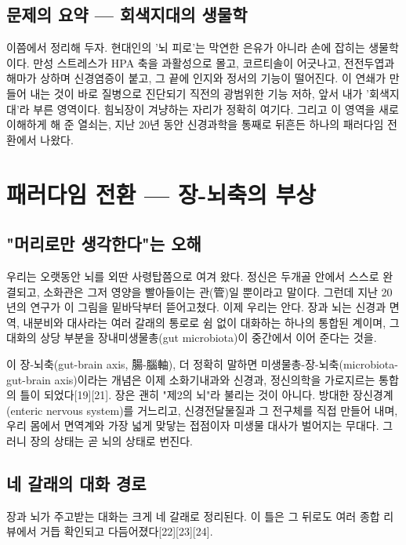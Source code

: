 \documentclass[12pt,oneside]{book}
\begin{document}
\subsection{문제의 요약 — 회색지대의 생물학}

이쯤에서 정리해 두자. 현대인의 '뇌 피로'는 막연한 은유가 아니라 손에 잡히는 생물학이다. 만성 스트레스가 HPA 축을 과활성으로 몰고, 코르티솔이 어긋나고, 전전두엽과 해마가 상하며 신경염증이 붙고, 그 끝에 인지와 정서의 기능이 떨어진다. 이 연쇄가 만들어 내는 것이 바로 질병으로 진단되기 직전의 광범위한 기능 저하, 앞서 내가 '회색지대'라 부른 영역이다. 힘뇌장이 겨냥하는 자리가 정확히 여기다. 그리고 이 영역을 새로 이해하게 해 준 열쇠는, 지난 20년 동안 신경과학을 통째로 뒤흔든 하나의 패러다임 전환에서 나왔다.

\section{패러다임 전환 — 장-뇌축의 부상}

\subsection{"머리로만 생각한다"는 오해}

우리는 오랫동안 뇌를 외딴 사령탑쯤으로 여겨 왔다. 정신은 두개골 안에서 스스로 완결되고, 소화관은 그저 영양을 빨아들이는 관(管)일 뿐이라고 말이다. 그런데 지난 20년의 연구가 이 그림을 밑바닥부터 뜯어고쳤다. 이제 우리는 안다. 장과 뇌는 신경과 면역, 내분비와 대사라는 여러 갈래의 통로로 쉼 없이 대화하는 하나의 통합된 계이며, 그 대화의 상당 부분을 장내미생물총(gut microbiota)이 중간에서 이어 준다는 것을.

이 장-뇌축(gut-brain axis, 腸-腦軸), 더 정확히 말하면 미생물총-장-뇌축(microbiota-gut-brain axis)이라는 개념은 이제 소화기내과와 신경과, 정신의학을 가로지르는 통합의 틀이 되었다[19][21]. 장은 괜히 "제2의 뇌"라 불리는 것이 아니다. 방대한 장신경계(enteric nervous system)를 거느리고, 신경전달물질과 그 전구체를 직접 만들어 내며, 우리 몸에서 면역계와 가장 넓게 맞닿는 접점이자 미생물 대사가 벌어지는 무대다. 그러니 장의 상태는 곧 뇌의 상태로 번진다.

\subsection{네 갈래의 대화 경로}

장과 뇌가 주고받는 대화는 크게 네 갈래로 정리된다. 이 틀은 그 뒤로도 여러 종합 리뷰에서 거듭 확인되고 다듬어졌다[22][23][24].
\end{document}
